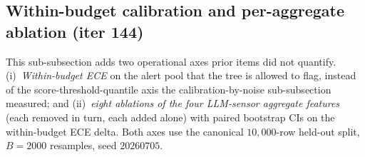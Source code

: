 \documentclass{article}
\begin{document}
\subsection{Within-budget calibration and per-aggregate ablation (iter 144)}
\label{sec:p8-evidence-within-budget}

This sub-subsection adds two operational axes prior items did not
quantify. (i)~\emph{Within-budget ECE} on the alert pool that the tree
is allowed to flag, instead of the score-threshold-quantile axis the
calibration-by-noise sub-subsection measured; and (ii)~\emph{eight
ablations of the four LLM-sensor aggregate features} (each removed in
turn, each added alone) with paired bootstrap CIs on the within-budget
ECE delta. Both axes use the canonical $10{,}000$-row held-out split,
$B{=}2000$ resamples, seed $20260705$.
\end{document}
